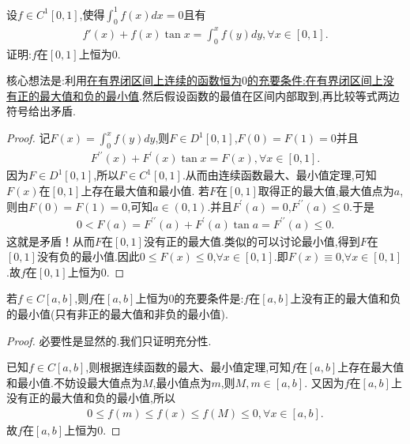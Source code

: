 \documentclass[lang=cn,newtx,10pt,scheme=chinese]{../Template/elegantbook}
\begin{document}
\begin{example}
设$f\in C^1\left[ 0,1 \right] $,使得$\int_0^1{f\left( x \right) dx}=0$且有
\begin{align*}
f'\left( x \right) +f\left( x \right) \tan x=\int_0^x{f\left( y \right) dy,\forall x\in \left[ 0,1 \right] .}
\end{align*}
证明:$f$在$[0,1]$上恒为$0$.
\end{example}
\begin{note}
核心想法是:利用\hyperref[conclusion:在有界闭区间上连续的函数恒为$0$的充要条件:在有界闭区间上没有正的最大值和负的最小值]{在有界闭区间上连续的函数恒为$0$的充要条件:在有界闭区间上没有正的最大值和负的最小值}.然后假设函数的最值在区间内部取到,再比较等式两边符号给出矛盾.
\end{note}
\begin{proof}
记\(F(x) = \int_{0}^{x}f(y)dy\),则\(F \in D^1[0,1]\),\(F(0) = F(1) = 0\)并且
\begin{align*}
F^{\prime\prime}(x) + F^{\prime}(x)\tan x = F(x),\forall x \in [0,1].
\end{align*}
因为\(F \in D^1[0,1]\),所以\(F \in C^1[0,1]\).从而由连续函数最大、最小值定理,可知\(F(x)\)在\([0,1]\)上存在最大值和最小值.
若\(F\)在\([0,1]\)取得正的最大值,最大值点为\(a\),则由\(F(0) = F(1) = 0\),可知\(a \in (0,1)\).并且\(F^{\prime}(a) = 0\),\(F^{\prime\prime}(a) \leqslant 0\).于是
\begin{align*}
0 < F(a) = F^{\prime\prime}(a) + F^{\prime}(a)\tan a = F^{\prime\prime}(a) \leqslant 0.
\end{align*}
这就是矛盾！从而\(F\)在\([0,1]\)没有正的最大值.类似的可以讨论最小值,得到\(F\)在\([0,1]\)没有负的最小值.因此\(0 \leqslant F(x) \leqslant 0\),\(\forall x \in [0,1]\).即\(F(x) \equiv 0\),\(\forall x \in [0,1]\).故\(f\)在\([0,1]\)上恒为\(0\). 
\end{proof}
\begin{conclusion}\label{conclusion:在有界闭区间上连续的函数恒为$0$的充要条件:在有界闭区间上没有正的最大值和负的最小值}
若$f\in C[a,b]$,则$f$在$[a,b]$上恒为$0$的充要条件是:$f$在$[a,b]$上没有正的最大值和负的最小值(只有非正的最大值和非负的最小值).
\begin{proof}
必要性是显然的.我们只证明充分性.

已知$f\in C[a,b]$,则根据连续函数的最大、最小值定理,可知$f$在$[a,b]$上存在最大值和最小值.不妨设最大值点为$M$,最小值点为$m$,则$M,m\in[a,b]$.
又因为$f$在$[a,b]$上没有正的最大值和负的最小值,所以
\begin{align*}
0\leq f(m)\leq f(x)\leq f(M)\leq 0,\forall x\in[a,b].
\end{align*}
故$f$在$[a,b]$上恒为$0$.
\end{proof}
\end{conclusion}
\end{document}

